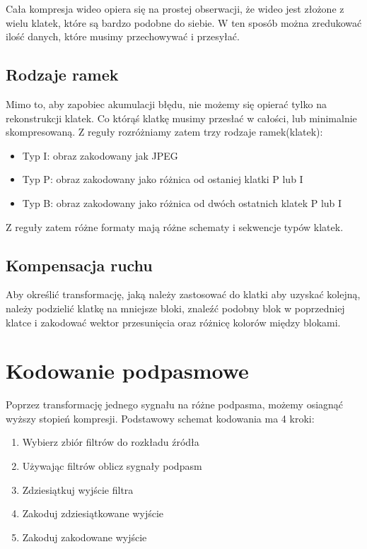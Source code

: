 \documentclass{../konspekt}
\begin{document}
\begin{multicols}{2}
  Cała kompresja wideo opiera się na prostej obserwacji, że wideo jest
  złożone z wielu klatek, które są bardzo podobne do siebie. W ten sposób
  można zredukować ilość danych, które musimy przechowywać i przesyłać.

  \subsection*{Rodzaje ramek}

  Mimo to, aby zapobiec akumulacji błędu, nie możemy się opierać tylko na
  rekonstrukcji klatek. Co którąś klatkę musimy przesłać w całości, lub
  minimalnie skompresowaną. Z reguły rozróżniamy zatem trzy rodzaje
  ramek(klatek):
  \begin{itemize}
    \item Typ I: obraz zakodowany jak JPEG
    \item Typ P: obraz zakodowany jako różnica od ostaniej klatki P lub I
    \item Typ B: obraz zakodowany jako różnica od dwóch ostatnich klatek P lub I
  \end{itemize}
  Z reguły zatem różne formaty mają różne schematy i sekwencje typów klatek.

  \subsection*{Kompensacja ruchu}

  Aby określić transformację, jaką należy zastosować do klatki aby
  uzyskać kolejną,
  należy podzielić klatkę na mniejsze bloki, znaleźć podobny blok w poprzedniej
  klatce i zakodować wektor przesunięcia oraz różnicę kolorów między blokami.

  \section*{Kodowanie podpasmowe}

  Poprzez transformację jednego sygnału na różne podpasma, możemy
  osiagnąć wyższy stopień kompresji. Podstawowy schemat kodowania ma 4 kroki:
  \begin{enumerate}
    \item Wybierz zbiór filtrów do rozkładu źródła
    \item Używając filtrów oblicz sygnały podpasm
    \item Zdziesiątkuj wyjście filtra
    \item Zakoduj zdziesiątkowane wyjście
    \item Zakoduj zakodowane wyjście
  \end{enumerate}


\end{multicols}
\end{document}
